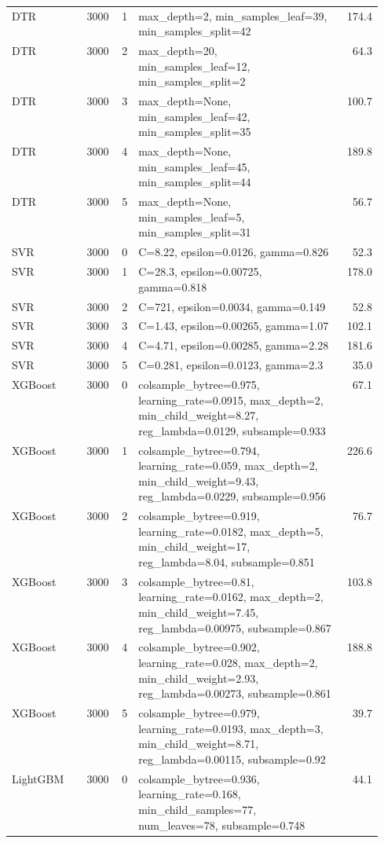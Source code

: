 \begin{longtable}{lrrp{0.55\linewidth}r}
DTR & 3000 & 1 & max\_depth=2, min\_samples\_leaf=39, min\_samples\_split=42 & 174.4 \\
DTR & 3000 & 2 & max\_depth=20, min\_samples\_leaf=12, min\_samples\_split=2 & 64.3 \\
DTR & 3000 & 3 & max\_depth=None, min\_samples\_leaf=42, min\_samples\_split=35 & 100.7 \\
DTR & 3000 & 4 & max\_depth=None, min\_samples\_leaf=45, min\_samples\_split=44 & 189.8 \\
DTR & 3000 & 5 & max\_depth=None, min\_samples\_leaf=5, min\_samples\_split=31 & 56.7 \\
SVR & 3000 & 0 & C=8.22, epsilon=0.0126, gamma=0.826 & 52.3 \\
SVR & 3000 & 1 & C=28.3, epsilon=0.00725, gamma=0.818 & 178.0 \\
SVR & 3000 & 2 & C=721, epsilon=0.0034, gamma=0.149 & 52.8 \\
SVR & 3000 & 3 & C=1.43, epsilon=0.00265, gamma=1.07 & 102.1 \\
SVR & 3000 & 4 & C=4.71, epsilon=0.00285, gamma=2.28 & 181.6 \\
SVR & 3000 & 5 & C=0.281, epsilon=0.0123, gamma=2.3 & 35.0 \\
XGBoost & 3000 & 0 & colsample\_bytree=0.975, learning\_rate=0.0915, max\_depth=2, min\_child\_weight=8.27, reg\_lambda=0.0129, subsample=0.933 & 67.1 \\
XGBoost & 3000 & 1 & colsample\_bytree=0.794, learning\_rate=0.059, max\_depth=2, min\_child\_weight=9.43, reg\_lambda=0.0229, subsample=0.956 & 226.6 \\
XGBoost & 3000 & 2 & colsample\_bytree=0.919, learning\_rate=0.0182, max\_depth=5, min\_child\_weight=17, reg\_lambda=8.04, subsample=0.851 & 76.7 \\
XGBoost & 3000 & 3 & colsample\_bytree=0.81, learning\_rate=0.0162, max\_depth=2, min\_child\_weight=7.45, reg\_lambda=0.00975, subsample=0.867 & 103.8 \\
XGBoost & 3000 & 4 & colsample\_bytree=0.902, learning\_rate=0.028, max\_depth=2, min\_child\_weight=2.93, reg\_lambda=0.00273, subsample=0.861 & 188.8 \\
XGBoost & 3000 & 5 & colsample\_bytree=0.979, learning\_rate=0.0193, max\_depth=3, min\_child\_weight=8.71, reg\_lambda=0.00115, subsample=0.92 & 39.7 \\
LightGBM & 3000 & 0 & colsample\_bytree=0.936, learning\_rate=0.168, min\_child\_samples=77, num\_leaves=78, subsample=0.748 & 44.1 \\

\end{longtable}
